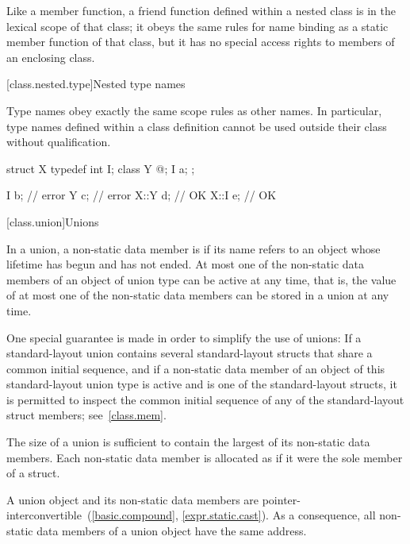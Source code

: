 \pnum
{}%
Like a member function, a friend function defined
within a nested class is in the lexical scope of that class; it obeys
the same rules for name binding as a static member function of that
class, but it has no special access rights to
members of an enclosing class.

[class.nested.type]{Nested type names}
%
%

\pnum
Type names obey exactly the same scope rules as other names. In
particular, type names defined within a class definition cannot be used
outside their class without qualification.
\begin{example}
\begin{codeblock}
struct X {
  typedef int I;
  class Y { @\commentellip@ };
  I a;
};

I b;                            // error
Y c;                            // error
X::Y d;                         // OK
X::I e;                         // OK
\end{codeblock}
\end{example}%

[class.union]{Unions}%

\pnum
In a union,
a non-static data member is 
if its name refers to an object
whose lifetime has begun and has not ended.
At most one of the non-static data members of an object of union type
can be active at any
time, that is, the value of at most one of the non-static data members can be
stored in a union at any time. \begin{note} One special guarantee is made in order to
simplify the use of unions: If a standard-layout union contains several standard-layout
structs that share a common initial sequence, and
if a non-static data member of an object of this standard-layout union type
is active and is one of the standard-layout structs,
it is permitted to inspect the common initial sequence
of any of the standard-layout struct members;
see~\ref{class.mem}.
\end{note}

\pnum
The size of a union is sufficient to contain the largest
of its non-static data members. Each non-static data member is allocated
as if it were the sole member of a struct.
\begin{note}
A union object and its non-static data members are
pointer-interconvertible~(\ref{basic.compound}, \ref{expr.static.cast}).
As a consequence, all non-static data members of a
union object have the same address.
\end{note}

